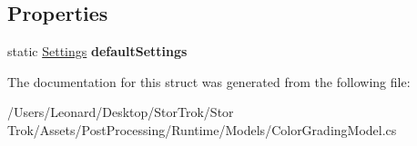 \subsection*{Properties}
\begin{DoxyCompactItemize}
\item 
\mbox{\label{struct_unity_engine_1_1_post_processing_1_1_color_grading_model_1_1_settings_a56e20088ac2842af86cf031e7554b428}} 
static \hyperlink{struct_unity_engine_1_1_post_processing_1_1_color_grading_model_1_1_settings}{Settings} {\bfseries default\+Settings}
\end{DoxyCompactItemize}


The documentation for this struct was generated from the following file\+:\begin{DoxyCompactItemize}
\item 
/\+Users/\+Leonard/\+Desktop/\+Stor\+Trok/\+Stor Trok/\+Assets/\+Post\+Processing/\+Runtime/\+Models/Color\+Grading\+Model.\+cs\end{DoxyCompactItemize}
